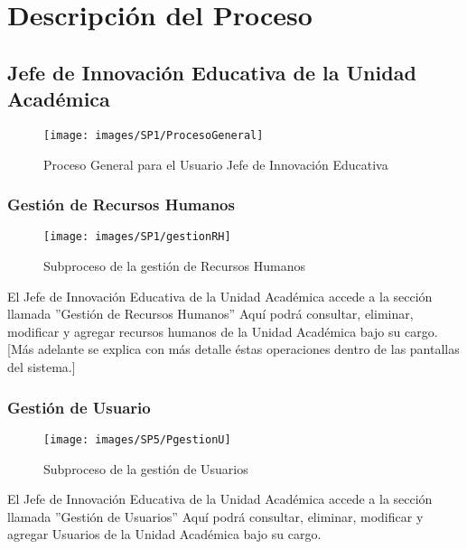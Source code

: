 \chapter{Descripción del Proceso}
        \section{Jefe de Innovación Educativa de la Unidad Académica}
        \begin{figure}[!hbtp]
        	\centering
        	\hypertarget{BPMNG}{\texttt{[image: images/SP1/ProcesoGeneral]}
        	\caption{Proceso General para el Usuario Jefe de Innovación Educativa}}
        	\label{BPMNG}
        \end{figure}
        \newpage
        \subsection{Gestión de Recursos Humanos}

        \begin{figure}[!hbtp]
            \centering
            \hypertarget{BPMNGRH}{\texttt{[image: images/SP1/gestionRH]}}
            \caption{Subproceso de la gestión de Recursos Humanos}
            \label{BPMNGRH}
        \end{figure}

        El Jefe de Innovación Educativa de la Unidad Académica accede a la sección llamada ''Gestión de Recursos Humanos'' Aquí podrá consultar, eliminar, modificar y agregar recursos humanos de la Unidad Académica bajo su cargo. \\

        [Más adelante se explica con más detalle éstas operaciones dentro de las pantallas del sistema.]\\
        \newpage
    	\subsection{Gestión de Usuario}

        \begin{figure}[!hbtp]
        	\centering
        	\hypertarget{BPMNGRH}{\texttt{[image: images/SP5/PgestionU]}}
        	\caption{Subproceso de la gestión de Usuarios}
        	\label{BPMNGRH}
        \end{figure}

        El Jefe de Innovación Educativa de la Unidad Académica accede a la sección llamada ''Gestión de Usuarios'' Aquí podrá consultar, eliminar, modificar y agregar Usuarios de la Unidad Académica bajo su cargo. \\

